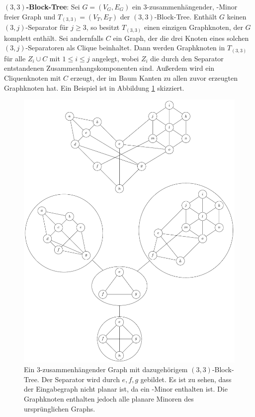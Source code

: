 \textbf{$(3, 3)$-Block-Tree}: Sei $G = (V_G, E_G)$ ein $3$-zusammenhängender, \kf-Minor freier Graph und $T_{(3, 3)} = (V_T, E_T)$ der $(3, 3)$-Block-Tree.
Enthält $G$ keinen $(3, j)$-Separator für $j \geq 3$, so besitzt $T_{(3, 3)}$ einen einzigen Graphknoten, der $G$ komplett enthält.
Sei andernfalls $C$ ein Graph, der die drei Knoten eines solchen $(3, j)$-Separatoren als Clique beinhaltet.
Dann werden Graphknoten in $T_{(3, 3)}$ für alle $Z_i \cup C$ mit $1 \leq i \leq j$ angelegt, wobei $Z_i$ die durch den Separator entstandenen Zusammenhangskomponenten sind.
Außerdem wird ein Cliquenknoten mit $C$ erzeugt, der im Baum Kanten zu allen zuvor erzeugten Graphknoten hat.
Ein Beispiel ist in Abbildung \ref{fig:33-Block-Tree} skizziert.
\begin{figure}[H]
  \centering
  \includegraphics[width=\textwidth,height=\textheight,keepaspectratio]{bilder/33-Block-Tree.pdf}
  \caption{Ein $3$-zusammenhängender Graph mit dazugehörigem $(3, 3)$-Block-Tree.
           Der Separator wird durch ${e, f, g}$ gebildet.
           Es ist zu sehen, dass der Eingabegraph nicht planar ist, da ein \kdd-Minor enthalten ist.
           Die Graphknoten enthalten jedoch alle planare Minoren des ursprünglichen Graphs.}
  \label{fig:33-Block-Tree}
\end{figure}


